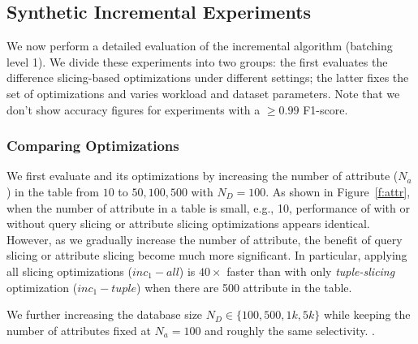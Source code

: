 \subsection{Synthetic Incremental Experiments}
\label{sec:experiments:synth}
We now perform a detailed evaluation of the incremental algorithm (batching level 1).
We divide these experiments into two groups: the first evaluates the difference slicing-based 
optimizations under different settings; the latter fixes the set of optimizations and varies workload and dataset parameters.
Note that we don't show accuracy figures for experiments with a $\ge 0.99$ F1-score.

\subsubsection{Comparing Optimizations}

We first evaluate \sys and its optimizations by increasing the number of attribute ($N_a$)
in the table from $10$ to $50, 100, 500$ with $N_D = 100$. As shown 
in Figure~\ref{f:attr}, when the number of attribute in a table is small, e.g., 10, 
performance of \sys with or without query slicing or attribute slicing optimizations 
appears identical. However, as we gradually increase the number of attribute, the benefit
of query slicing or attribute slicing become much more significant. 
In particular, applying all slicing optimizations ($inc_1-all$) is $40\times$ faster than \sys with only \emph{tuple-slicing} 
optimization ($inc_1-tuple$) when there are 500 attribute in the table.  

We further increasing the database size $N_D \in \{100,500, 1k, 5k\}$ while keeping the number of attributes fixed at $N_a = 100$ and roughly the same selectivity. 
 .

